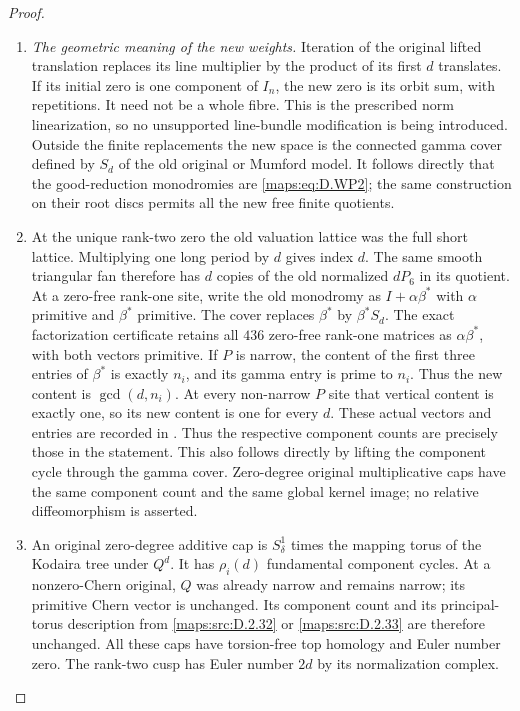 \begin{proof}
\begin{enumerate}[label=\arabic*.,leftmargin=*]
\item \emph{The geometric meaning of the new weights.}
Iteration of the original lifted translation replaces
its line multiplier by the product of its first $d$
translates. If its initial zero is one component of
$I_n$, the new zero is its orbit sum, with repetitions.
It need not be a whole fibre. This is the prescribed
norm linearization, so no unsupported line-bundle
modification is being introduced.
Outside the finite replacements the new space is
the connected gamma cover defined by $S_d$ of the
old original or Mumford model. It follows directly
that the good-reduction monodromies are \eqref{maps:eq:D.WP2};
the same construction on their root discs permits
all the new free finite quotients.

\item At the unique rank-two zero the old valuation
lattice was the full short lattice. Multiplying
one long period by $d$ gives index $d$. The same
smooth triangular fan therefore has $d$ copies
of the old normalized $dP_6$ in its quotient.
At a zero-free rank-one site, write the old
monodromy as $I+\alpha\beta^*$ with $\alpha$
primitive and $\beta^*$ primitive. The cover
replaces $\beta^*$ by $\beta^*S_d$.
The exact factorization certificate retains all $436$
zero-free rank-one matrices as $\alpha\beta^*$, with
both vectors primitive. If $P$ is narrow, the content
of the first three entries of $\beta^*$ is exactly
$n_i$, and its gamma entry is prime to $n_i$. Thus
the new content is $\gcd(d,n_i)$. At every non-narrow
$P$ site that vertical content is exactly one, so
its new content is one for every $d$. These actual
vectors and entries are recorded in
.
Thus the respective component counts are precisely
those in the statement. This also follows directly
by lifting the component cycle through the gamma
cover. Zero-degree original multiplicative caps
have the same component count and the same global
kernel image; no relative diffeomorphism is asserted.

\item An original zero-degree additive cap is
$S^1_\delta$ times the mapping torus of the Kodaira
tree under $Q^d$. It has $\rho_i(d)$ fundamental
component cycles. At a nonzero-Chern original, $Q$
was already narrow and remains narrow; its
primitive Chern vector is unchanged. Its component
count and its principal-torus description from
\ref{maps:src:D.2.32} or \ref{maps:src:D.2.33} are therefore unchanged.
All these caps have torsion-free top homology and
Euler number zero. The rank-two cusp has Euler
number $2d$ by its normalization complex.


\end{enumerate}
\end{proof}
